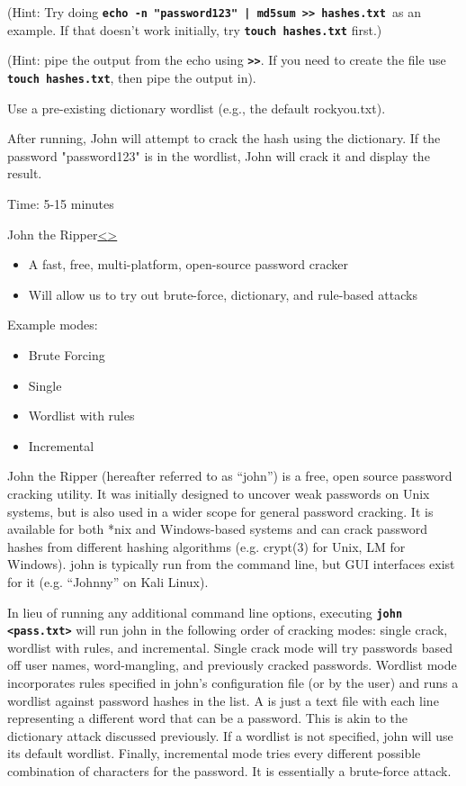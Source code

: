 \documentclass[12pt]{article}
\newcommand{\code}[1]{\texttt{\bfseries#1}}
\newenvironment{instructionblock}{\Large\bgroup}{\egroup}
\newcommand{\bi}{\begin{itemize}}
\newcommand{\ei}{\end{itemize}}
\begin{document}
\item (Hint: Try doing \code{echo -n "password123" | md5sum >> hashes.txt }as an example. If that doesn't work initially, try \code{touch hashes.txt} first.)
\item (Hint: pipe the output from the echo using \code{>>}. If you need to create the file use \code{touch hashes.txt}, then pipe the output in).
\item Use a pre-existing dictionary wordlist (e.g., the default rockyou.txt).
\item After running, John will attempt to crack the hash using the dictionary. If the password "password123" is in the wordlist, John will crack it and display the result. 

\vfill 

Time: 5-15 minutes

\pagebreak
\begin{slide}{John the Ripper}{\hyperref[slide 10]{\textless}\hyperref[slide 12]{\textgreater}}
	\begin{instructionblock}
		\bi 
			\item A fast, free, multi-platform, open-source password cracker
			\item Will allow us to try out brute-force, dictionary, and rule-based attacks
		\ei 
		Example modes:
		\bi
			\item Brute Forcing
			\item Single
			\item Wordlist with rules
			\item Incremental
		\ei
	\end{instructionblock}
\end{slide}
\vfill

John the Ripper (hereafter referred to as ``john'') is a free, open source password cracking utility. It was initially designed to uncover weak passwords on Unix systems, but is also used in a wider scope for general password cracking. It is available for both *nix and Windows-based systems and can crack password hashes from different hashing algorithms (e.g. crypt(3) for Unix, LM for Windows). \cite{john} john is typically run from the command line, but GUI interfaces exist for it (e.g. ``Johnny'' on Kali Linux).

In lieu of running any additional command line options, executing \code{john \textless pass.txt\textgreater} will run john in the following order of cracking modes: single crack, wordlist with rules, and incremental. Single crack mode will try passwords based off user names, word-mangling, and previously cracked passwords. Wordlist mode incorporates rules specified in john's configuration file (or by the user) and runs a wordlist against password hashes in the list. A  is just a text file with each line representing a different word that can be a password. This is akin to the dictionary attack discussed previously. If a wordlist is not specified, john will use its default wordlist. Finally, incremental mode tries every different possible combination of characters for the password. It is essentially a brute-force attack. \cite{john}
\end{document}
